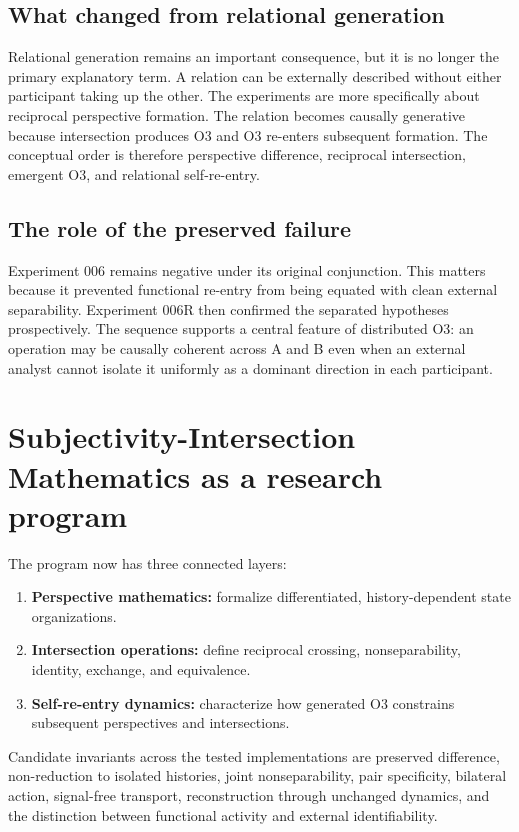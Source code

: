 \documentclass[11pt,a4paper]{article}
\begin{document}
\subsection{What changed from relational generation}

Relational generation remains an important consequence, but it is no longer the primary explanatory term. A relation can be externally described without either participant taking up the other. The experiments are more specifically about reciprocal perspective formation. The relation becomes causally generative because intersection produces O3 and O3 re-enters subsequent formation. The conceptual order is therefore perspective difference, reciprocal intersection, emergent O3, and relational self-re-entry.

\subsection{The role of the preserved failure}

Experiment 006 remains negative under its original conjunction. This matters because it prevented functional re-entry from being equated with clean external separability. Experiment 006R then confirmed the separated hypotheses prospectively. The sequence supports a central feature of distributed O3: an operation may be causally coherent across A and B even when an external analyst cannot isolate it uniformly as a dominant direction in each participant.

\section{Subjectivity-Intersection Mathematics as a research program}

The program now has three connected layers:
\begin{enumerate}
  \item \textbf{Perspective mathematics:} formalize differentiated, history-dependent state organizations.
  \item \textbf{Intersection operations:} define reciprocal crossing, nonseparability, identity, exchange, and equivalence.
  \item \textbf{Self-re-entry dynamics:} characterize how generated O3 constrains subsequent perspectives and intersections.
\end{enumerate}

Candidate invariants across the tested implementations are preserved difference, non-reduction to isolated histories, joint nonseparability, pair specificity, bilateral action, signal-free transport, reconstruction through unchanged dynamics, and the distinction between functional activity and external identifiability.
\end{document}
